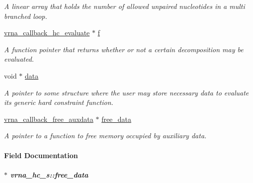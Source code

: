 \begin{DoxyCompactItemize}
\begin{DoxyCompactList}\small\item\em A linear array that holds the number of allowed unpaired nucleotides in a multi branched loop. \end{DoxyCompactList}\item 
\hypertarget{group__hard__constraints_a85714afbf27012165ec80c564bd62931}{}\hyperlink{group__hard__constraints_ga16eb71ac9a7a35369be2eaa9d8f8dfa0}{vrna\+\_\+callback\+\_\+hc\+\_\+evaluate} $\ast$ \hyperlink{group__hard__constraints_a85714afbf27012165ec80c564bd62931}{f}\label{group__hard__constraints_a85714afbf27012165ec80c564bd62931}

\begin{DoxyCompactList}\small\item\em A function pointer that returns whether or not a certain decomposition may be evaluated. \end{DoxyCompactList}\item 
\hypertarget{group__hard__constraints_acef3d722142cb5f4a8e114e5fbce3b1a}{}void $\ast$ \hyperlink{group__hard__constraints_acef3d722142cb5f4a8e114e5fbce3b1a}{data}\label{group__hard__constraints_acef3d722142cb5f4a8e114e5fbce3b1a}

\begin{DoxyCompactList}\small\item\em A pointer to some structure where the user may store necessary data to evaluate its generic hard constraint function. \end{DoxyCompactList}\item 
\hyperlink{group__fold__compound_ga3ae51bfd5fc3236652d1de4e3274b49b}{vrna\+\_\+callback\+\_\+free\+\_\+auxdata} $\ast$ \hyperlink{group__hard__constraints_a970e0e202c9e46ebc7640ddc43357ba6}{free\+\_\+data}
\begin{DoxyCompactList}\small\item\em A pointer to a function to free memory occupied by auxiliary data. \end{DoxyCompactList}\end{DoxyCompactItemize}


\paragraph{Field Documentation}
\hypertarget{group__hard__constraints_a970e0e202c9e46ebc7640ddc43357ba6}{}
\subparagraph[{free\+\_\+data}]{$\ast$ vrna\+\_\+hc\+\_\+s\+::free\+\_\+data}\label{group__hard__constraints_a970e0e202c9e46ebc7640ddc43357ba6}


